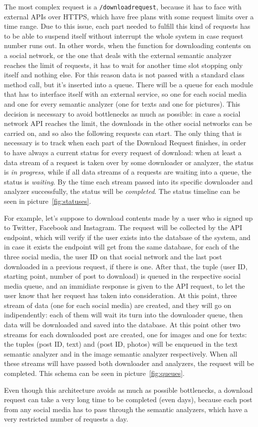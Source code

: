 The most complex request is a \texttt{/downloadrequest}, because it has to face with external APIs over HTTPS, which have free plans with some request limits over a time range. Due to this issue, each part needed to fulfill this kind of requests has to be able to suspend itself without interrupt the whole system in case request number runs out. In other words, when the function for downloading contents on a social network, or the one that deals with the external semantic analyzer reaches the limit of requests, it has to wait for another time slot stopping only itself and nothing else. For this reason data is not passed with a standard class method call, but it's inserted into a queue. There will be a queue for each module that has to interface itself with an external service, so one for each social media and one for every semantic analyzer (one for texts and one for pictures). This decision is necessary to avoid bottlenecks as much as possible: in case a social network API reaches the limit, the downloads in the other social networks can be carried on, and so also the following requests can start. The only thing that is necessary is to track when each part of the Download Request finishes, in order to have always a current status for every request of download: when at least a data stream of a request is taken over by some downloader or analyzer, the status is \textit{in progress}, while if all data streams of a requests are waiting into a queue, the status is \textit{waiting}. By the time each stream passed into its specific downloader and analyzer successfully, the status will be \textit{completed}. The status timeline can be seen in picture~\ref{fig:statuses}.

For example, let's suppose to download contents made by a user who is signed up to Twitter, Facebook and Instagram. The request will be collected by the API endpoint, which will verify if the user exists into the database of the system, and in case it exists the endpoint will get from the same database, for each of the three social media, the user ID on that social network and the last post downloaded in a previous request, if there is one. After that, the tuple (user ID, starting point, number of post to download) is queued in the respective social media queue, and an immidiate response is given to the API request, to let the user know that her request has taken into consideration. At this point, three stream of data (one for each social media) are created, and they will go on indipendently: each of them will wait its turn into the downloader queue, then data will be downloaded and saved into the database. At this point other two streams for each downloaded post are created, one for images and one for texts: the tuples (post ID, text) and (post ID, photos) will be enqueued in the text semantic analyzer and in the image semantic analyzer respectively. When all these streams will have passed both downloader and analyzers, the request will be completed. This schema can be seen in picture~\ref{fig:queues}.

Even though this architecture avoids as much as possible bottlenecks, a download request can take a very long time to be completed (even days), because each post from any social media has to pass through the semantic analyzers, which have a very restricted number of requests a day.

